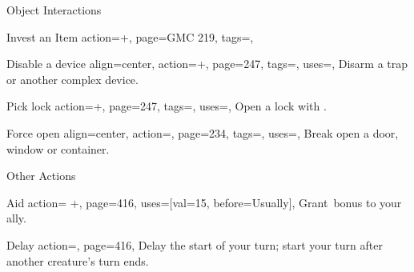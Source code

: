 \begin{PageBackLandscape}
\begin{TablesHalf}{\backTableHeight}
\begin{Table}{Object Interactions}
\begin{entry}{Invest an Item}{%
                action=+,
                page=GMC 219,
                tags=\Manipulate,
            }
            \end{entry}
            \breakLine
            \begin{entry}{Disable a device}{%
                align=center,
                action=+,
                page=247,
                tags=\Manipulate,
                uses={\Thievery[tags={T}]},
            }
                Disarm a trap or another complex device. \hfill {}\\
                \hfill
            \end{entry}
            \begin{entry}{Pick lock}{%
                action=+,
                page=247,
                tags=\Manipulate,
                uses={\Thievery[tags={T}]},
            }
                Open a lock with . \hfill{}\;
            \end{entry}
            \begin{entry}{Force open}{%
                align=center,
                action=,
                page=234,
                tags=\Attack,
                uses=\Athletics,
            }
                Break open a door, window or container. \hfill{}\\
                \hfill
            \end{entry}
        \end{Table}%
        \TableSpace
        \begin{Table}{Other Actions}
            \begin{entry}{Aid}{%
                action= +,
                page=416,
                uses={[val=15, before=Usually]},
            }
                Grant \,\Cirm bonus to your ally. \hfill
                \quad{}
            \end{entry}
            \begin{entry}{Delay}{%
                action=,
                page=416,
            }
                Delay the start of your turn; start your turn after another creature's turn ends.
            \end{entry}

\end{Table}
\end{TablesHalf}
\end{PageBackLandscape}
